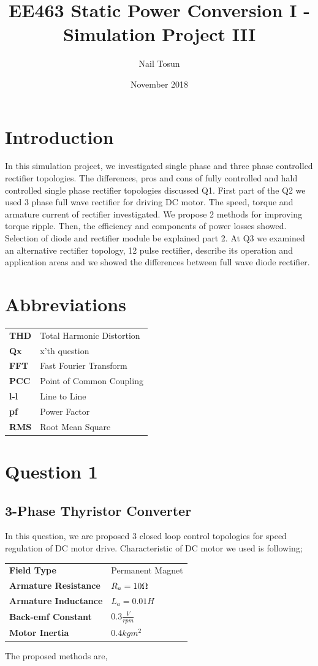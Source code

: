 \documentclass[fleqn, a4paper]{report}
\title{EE463 Static Power Conversion I 
-Simulation Project III}
\author{Nail Tosun}
\date{November 2018}
\begin{document}
\maketitle

\section*{Introduction}
In this simulation project, we investigated single phase and three phase controlled rectifier topologies. The differences, pros and cons of fully controlled and hald controlled single phase rectifier topologies discussed Q1. First part of the Q2 we used 3 phase full wave rectifier for driving DC motor. The speed, torque and armature current of rectifier investigated. We propose 2 methods for improving torque ripple. Then, the efficiency and components of power losses showed. Selection of diode and rectifier module be explained part 2. At Q3 we examined an alternative rectifier topology, 12 pulse rectifier, describe its operation and application areas and we showed the differences between full wave diode rectifier. 
\section*{Abbreviations}
\begin{table}[H]
\begin{tabular}{ll}
\textbf{THD} & Total Harmonic Distortion \\
\textbf{Qx}  & x'th question \\
\textbf{FFT} & Fast Fourier Transform\\
\textbf{PCC} & Point of Common Coupling \\
\textbf{l-l} & Line to Line \\
\textbf{pf} & Power Factor \\
\textbf{RMS} & Root Mean Square
\end{tabular}
\end{table}
\section*{Question 1}
\subsection*{3-Phase Thyristor Converter}
In this question, we are proposed 3 closed loop control topologies for speed regulation of DC motor drive. 
Characteristic of DC motor we used is following;
\begin{table}[H]
\centering
\begin{tabular}{ll}
\textbf{Field Type}          & Permanent Magnet    \\
\textbf{Armature Resistance} & $R_a = 10 \ohm$     \\
\textbf{Armature Inductance} & $L_a = 0.01 H$      \\
\textbf{Back-emf Constant}   & $0.3 \frac{V}{rpm}$ \\
\textbf{Motor Inertia}       & $0.4 kg m^2$       
\end{tabular}
\end{table}
The proposed methods are, 
 
\end{document}
